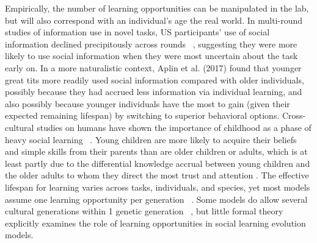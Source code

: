 \documentclass[letterpaper,11.5pt]{scrartcl}
\newcommand{\mt}[1]{{\textcolor{myorange} {({\tiny MT:} #1)}}}
\newcommand{\ps}[1]{{\textcolor{mygreen} {({\tiny PS:} #1)}}}
\begin{document}
Empirically, the number of learning opportunities can be manipulated in the lab,
but will also correspond with an individual's age the real world. In multi-round
studies of information use in novel tasks, US participants' use of social
information declined precipitously across rounds ~\cite{McElreath2005}, suggesting
they were more likely to use social information when they were most uncertain
about the task early on. In a more naturalistic context, Aplin et al. (2017)
\nocite{Aplin2017} found that younger great tits more readily used social
information compared with older individuals, possibly because they had accrued
less information via individual learning, and also possibly because younger
individuals have the most to gain (given their expected remaining lifespan) by
switching to superior behavioral options. 
Cross-cultural studies on humans have shown the importance of childhood as a phase
of heavy social learning ~\cite{Reyes2016}. Young children are more likely to
acquire their beliefs and simple skills from their parents than are older children
or adults, which is at least partly due to the differential knowledge accrual
between young children and the older adults to whom they direct the most trust and
attention \cite{kline2013teaching}.
The effective lifespan for learning
varies across tasks, individuals, and species, yet most models assume one learning
opportunity per generation ~\cite{Feldman1996,Henrich1998, perreault2012bayesian}.
Some models do allow several cultural generations within 1 genetic generation
~\cite{Enquist2007}, but little formal theory explicitly examines the role of
learning opportunities in social learning evolution models. 

\end{document}
